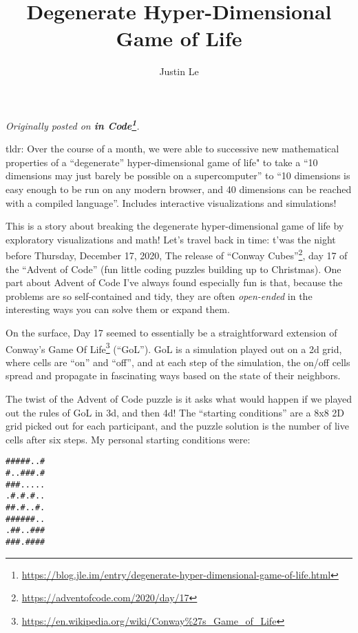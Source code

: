 \documentclass[]{article}
\title{Degenerate Hyper-Dimensional Game of Life}
\author{Justin Le}
\renewcommand{\href}[2]{#2\footnote{\url{#1}}}
\begin{document}
\maketitle

\emph{Originally posted on
\textbf{\href{https://blog.jle.im/entry/degenerate-hyper-dimensional-game-of-life.html}{in
Code}}.}

tldr: Over the course of a month, we were able to successive new mathematical
properties of a ``degenerate'' hyper-dimensional game of life" to take a ``10
dimensions may just barely be possible on a supercomputer'' to ``10 dimensions
is easy enough to be run on any modern browser, and 40 dimensions can be reached
with a compiled language''. Includes interactive visualizations and simulations!

This is a story about breaking the degenerate hyper-dimensional game of life by
exploratory visualizations and math! Let's travel back in time: t'was the night
before Thursday, December 17, 2020, The release of
\href{https://adventofcode.com/2020/day/17}{``Conway Cubes''}, day 17 of the
``Advent of Code'' (fun little coding puzzles building up to Christmas). One
part about Advent of Code I've always found especially fun is that, because the
problems are so self-contained and tidy, they are often \emph{open-ended} in the
interesting ways you can solve them or expand them.

On the surface, Day 17 seemed to essentially be a straightforward extension of
\href{https://en.wikipedia.org/wiki/Conway\%27s_Game_of_Life}{Conway's Game Of
Life} (``GoL''). GoL is a simulation played out on a 2d grid, where cells are
``on'' and ``off'', and at each step of the simulation, the on/off cells spread
and propagate in fascinating ways based on the state of their neighbors.

The twist of the Advent of Code puzzle is it asks what would happen if we played
out the rules of GoL in 3d, and then 4d! The ``starting conditions'' are a 8x8
2D grid picked out for each participant, and the puzzle solution is the number
of live cells after six steps. My personal starting conditions were:

\begin{verbatim}
#####..#
#..###.#
###.....
.#.#.#..
##.#..#.
######..
.##..###
###.####
\end{verbatim}
\end{document}
